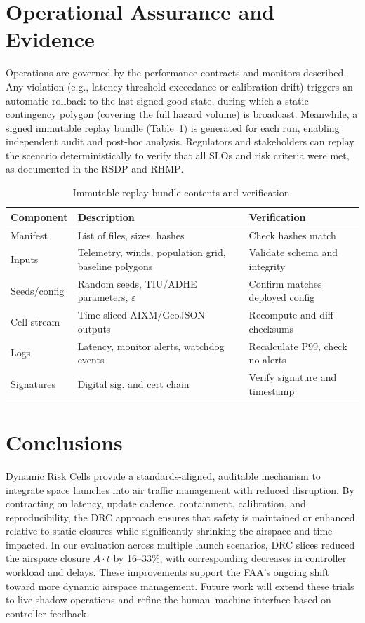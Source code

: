 \documentclass[journal]{new-aiaa}
\newcommand{\At}{\ensuremath{A\cdot t}}
\newcommand{\DRC}{\textsc{DRC}}
\newcommand{\RSDP}{\textsc{RSDP}}
\newcommand{\RHMP}{\textsc{RHMP}}
\newcommand{\AIXM}{\textsc{AIXM}}
\begin{document}
\section{Operational Assurance and Evidence}
Operations are governed by the performance contracts and monitors described. Any violation (e.g., latency threshold exceedance or calibration drift) triggers an automatic rollback to the last signed-good state, during which a static contingency polygon (covering the full hazard volume) is broadcast. Meanwhile, a signed immutable replay bundle (Table~\ref{tab:replay_bundle}) is generated for each run, enabling independent audit and post-hoc analysis. Regulators and stakeholders can replay the scenario deterministically to verify that all SLOs and risk criteria were met, as documented in the \RSDP{} and \RHMP{}.

\begin{table}[h!]
\centering
\caption{Immutable replay bundle contents and verification.}
\label{tab:replay_bundle}
\begin{tabular}{@{}p{3.8cm} p{5.7cm} p{3.0cm}@{}}
\toprule
Component & Description & Verification \\
\midrule
Manifest & List of files, sizes, hashes & Check hashes match \\
Inputs & Telemetry, winds, population grid, baseline polygons & Validate schema and integrity \\
Seeds/config & Random seeds, TIU/ADHE parameters, $\varepsilon$ & Confirm matches deployed config \\
Cell stream & Time-sliced \AIXM{}/GeoJSON outputs & Recompute and diff checksums \\
Logs & Latency, monitor alerts, watchdog events & Recalculate P99, check no alerts \\
Signatures & Digital sig. and cert chain & Verify signature and timestamp \\
\bottomrule
\end{tabular}
\end{table}

\section{Conclusions}
Dynamic Risk Cells provide a standards-aligned, auditable mechanism to integrate space launches into air traffic management with reduced disruption. By contracting on latency, update cadence, containment, calibration, and reproducibility, the \DRC{} approach ensures that safety is maintained or enhanced relative to static closures while significantly shrinking the airspace and time impacted. In our evaluation across multiple launch scenarios, \DRC{} slices reduced the airspace closure \At{} by 16--33\%, with corresponding decreases in controller workload and delays. These improvements support the FAA’s ongoing shift toward more dynamic airspace management.\cite{FAA2023,FAA_OIG_2023} Future work will extend these trials to live shadow operations and refine the human–machine interface based on controller feedback.
\end{document}
